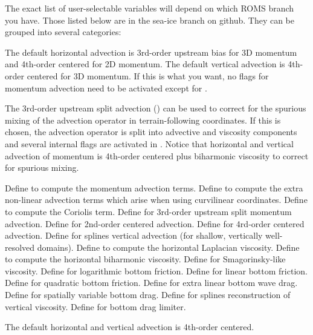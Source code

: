 The exact list of user-selectable  variables will depend
on which ROMS branch you have. Those listed below are in the sea-ice
branch on github. They can be grouped into several categories:
\begin{klist}
    \mbox{}
The default horizontal advection is 3rd-order upstream bias for
3D momentum and 4th-order centered for 2D momentum. The default
vertical advection is 4th-order centered for 3D momentum. If this
is what you want, no flags for momentum advection need to be
activated except for .

The 3rd-order upstream split advection () can be used
to correct for the spurious mixing of the advection operator in
terrain-following coordinates. If this is chosen, the advection
operator is split into advective and viscosity components and several
internal flags are activated in .  Notice that
horizontal and vertical advection of momentum is 4th-order centered
plus biharmonic viscosity to correct for spurious mixing.
  \begin{klist}
         Define to compute the momentum advection terms.
        Define to compute the extra
  non-linear advection terms which arise when using curvilinear coordinates.
         Define to compute the Coriolis term.
     Define for 3rd-order upstream split
  momentum advection.
     Define for 2nd-order centered advection.
     Define for 4rd-order centered advection.
     Define for splines vertical advection
    (for shallow, vertically well-resolved domains).
        Define to compute the
  horizontal Laplacian viscosity.
        Define to compute the
  horizontal biharmonic viscosity.
     Define for Smagorinsky-like viscosity.
     Define for logarithmic bottom friction.
       Define for linear bottom friction.
       Define for quadratic bottom friction.
     Define for extra linear bottom wave drag.
      Define for spatially variable bottom drag.
      Define for splines reconstruction of
  vertical viscosity.
      Define for bottom drag limiter.
  \end{klist}
   \mbox{}
The default horizontal and vertical advection is 4th-order centered.


\end{klist}
